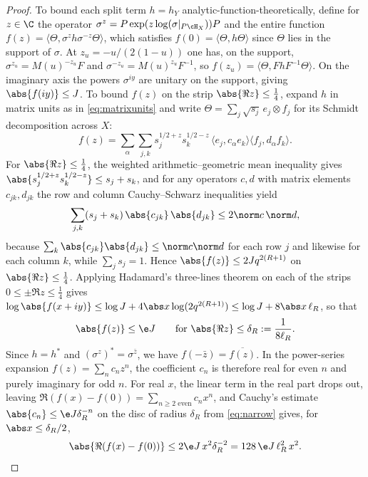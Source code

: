 \begin{proof}
To bound each split term $h=h_Y$ analytic-function-theoretically, define for
$z\in\C$ the operator $\sigma^z=P\exp(z\log(\sigma|_{P\cH_X}))P$ and the
entire function $f(z)=\langle\Theta,\sigma^zh\sigma^{-z}\Theta\rangle$,
which satisfies $f(0)=\langle\Theta,h\Theta\rangle$ since $\Theta$ lies in
the support of $\sigma$. At $z_u=-u/(2(1-u))$ one has, on the support,
$\sigma^{z_u}=M(u)^{-z_u}F$ and $\sigma^{-z_u}=M(u)^{z_u}F^{-1}$, so
$f(z_u)=\langle\Theta,Fh F^{-1}\Theta\rangle$. On the imaginary axis the
powers $\sigma^{iy}$ are unitary on the support, giving $\abs{f(iy)}\le J$.
To bound $f(z)$ on the strip $\abs{\Re z}\le\tfrac14$, expand $h$ in matrix
units as in \eqref{eq:matrixunits} and write
$\Theta=\sum_j\sqrt{s_j}\,e_j\otimes f_j$ for its Schmidt decomposition
across $X$:
\[
 f(z)=\sum_\alpha\sum_{j,k}s_j^{1/2+z}s_k^{1/2-z}\,
 \langle e_j,c_\alpha e_k\rangle\langle f_j,d_\alpha f_k\rangle .
\]
For $\abs{\Re z}\le\frac14$, the weighted arithmetic--geometric mean
inequality gives $\abs{s_j^{1/2+z}s_k^{1/2-z}}\le s_j+s_k$, and for any
operators $c,d$ with matrix elements $c_{jk},d_{jk}$ the row and column
Cauchy--Schwarz inequalities yield
\begin{equation}\label{eq:rowcolumn}
 \sum_{j,k}(s_j+s_k)\,\abs{c_{jk}}\,\abs{d_{jk}}\le 2\norm c\,\norm d ,
\end{equation}
because $\sum_k\abs{c_{jk}}\abs{d_{jk}}\le\norm c\norm d$ for each row $j$ and
likewise for each column $k$, while $\sum_j s_j=1$. Hence
$\abs{f(z)}\le 2Jq^{2(R+1)}$ on $\abs{\Re z}\le\frac14$. Applying
Hadamard's three-lines theorem on each of the strips $0\le\pm\Re z\le\frac14$
gives
$\log\abs{f(x+iy)}\le\log J+4\abs x\log(2q^{2(R+1)})\le \log J+8\abs x\,\ell_R$,
so that
\begin{equation}\label{eq:narrow}
 \abs{f(z)}\le \e J\qquad\text{for }\abs{\Re z}\le\delta_R:=\frac1{8\ell_R}.
\end{equation}
Since $h=h^*$ and $(\sigma^z)^*=\sigma^{\bar z}$, we have
$f(-\bar z)=\overline{f(z)}$. In the power-series expansion
$f(z)=\sum_nc_nz^n$, the coefficient $c_n$ is therefore real for even $n$
and purely imaginary for odd $n$. For real $x$, the linear term in the
real part drops out, leaving $\Re(f(x)-f(0))=\sum_{n\ge2\text{ even}}c_nx^n$,
and Cauchy's estimate $\abs{c_n}\le\e J\delta_R^{-n}$ on the disc of
radius $\delta_R$ from \eqref{eq:narrow} gives, for $\abs x\le\delta_R/2$,
\begin{equation}\label{eq:quadratic}
 \abs{\Re(f(x)-f(0))}\le 2\e J\,x^2\delta_R^{-2}=128\,\e J\,\ell_R^2\,x^2 .
\end{equation}

\end{proof}
